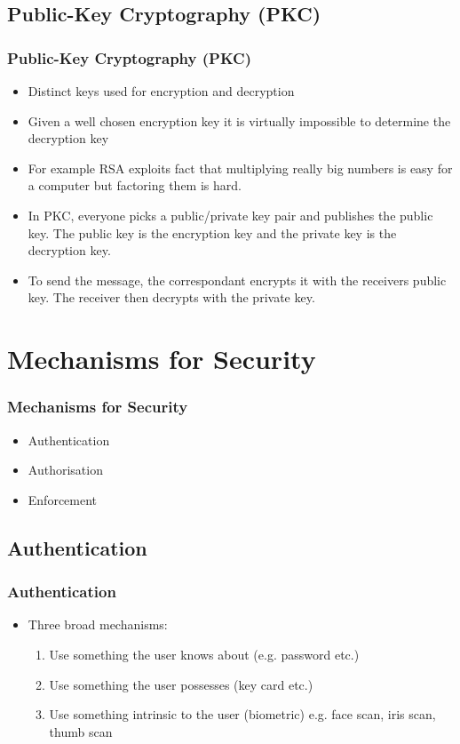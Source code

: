 \documentclass{beamer}
\begin{document}
\subsection{Public-Key Cryptography (PKC)}
\begin{frame}
\frametitle{Public-Key Cryptography (PKC)}
\begin{itemize}
\item Distinct keys used for encryption and decryption
\item Given a well chosen encryption key it is virtually impossible to determine the decryption key
\item For example RSA exploits fact that multiplying really big numbers is easy for a computer but factoring them is hard.
\item In PKC, everyone picks a public/private key pair and publishes the public key. The public key is the encryption key and the private key is the decryption key.
\item To send the message, the correspondant encrypts it with the receivers public key. The receiver then decrypts with the private key.
\end{itemize}
\end{frame}
\section{Mechanisms for Security}
\begin{frame}
\frametitle{Mechanisms for Security}
\begin{itemize}
\item Authentication
\item Authorisation
\item Enforcement
\end{itemize}
\end{frame}
\subsection{Authentication}
\begin{frame}
\frametitle{Authentication}
\begin{itemize}
\item Three broad mechanisms:
\begin{enumerate}
\item Use something the user knows about (e.g. password etc.)
\item Use something the user possesses (key card etc.)
\item Use something intrinsic to the user (biometric) e.g. face scan, iris scan, thumb scan
\end{enumerate}
\end{itemize}
\end{frame}
\end{document}
